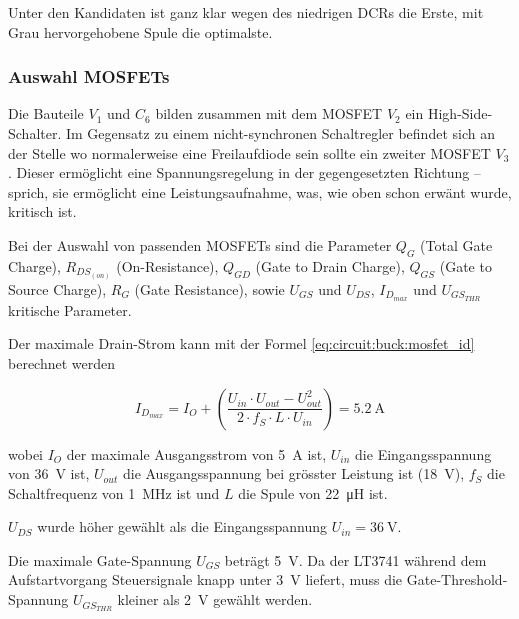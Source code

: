 Unter den Kandidaten ist ganz klar wegen des niedrigen DCRs die Erste,  mit Grau
hervorgehobene Spule die optimalste.

\subsubsection*{Auswahl MOSFETs}

Die  Bauteile  $V_1$  und  $C_6$  bilden  zusammen  mit  dem  MOSFET  $V_2$  ein
High-Side-Schalter. Im Gegensatz zu einem nicht-synchronen Schaltregler befindet
sich  an  der Stelle wo normalerweise eine Freilaufdiode sein sollte ein zweiter
MOSFET $V_3$. Dieser erm\"oglicht  eine  Spannungsregelung in der gegengesetzten
Richtung -- sprich, sie erm\"oglicht eine Leistungsaufnahme, was, wie oben schon
erw\"ant wurde, kritisch ist.

Bei  der  Auswahl von passenden MOSFETs sind die  Parameter  $Q_G$  (Total  Gate
Charge),  $R_{DS_{(on)}}$  (On-Resistance),  $Q_{GD}$  (Gate to  Drain  Charge),
$Q_{GS}$ (Gate to Source  Charge),  $R_G$  (Gate Resistance), sowie $U_{GS}$ und
$U_{DS}$, $I_{D_{max}}$ und $U_{GS_{THR}}$ kritische Parameter.

Der  maximale  Drain-Strom  kann mit der Formel  \ref{eq:circuit:buck:mosfet_id}
berechnet werden

\begin{equation}
    I_{D_{max}} = I_O + \left( \frac{U_{in} \cdot U_{out} - U_{out}^2}{2 \cdot f_S \cdot L \cdot U_{in}} \right) = \SI{5.2}{\ampere}
    \label{eq:circuit:buck:mosfet_id}
\end{equation}

wobei $I_O$ der maximale Ausgangsstrom  von  \SI{5}{\ampere}  ist,  $U_{in}$ die
Eingangsspannung von  \SI{36}{\volt}  ist,  $U_{out}$  die  Ausgangsspannung bei
gr\"osster  Leistung  ist   (\SI{18}{\volt}),   $f_S$   die  Schaltfrequenz  von
\SI{1}{\mega\hertz}  ist  und  $L$  die  Spule  von  \SI{22}{\micro\henry}  ist.

$U_{DS}$  wurde   h\"oher   gew\"ahlt   als   die   Eingangsspannung  $U_{in}  =
\SI{36}{\volt}$.

Die maximale  Gate-Spannung  $U_{GS}$  betr\"agt  \SI{5}{\volt}.  Da  der LT3741
w\"ahrend  dem Aufstartvorgang Steuersignale knapp unter \SI{3}{\volt}  liefert,
muss  die  Gate-Threshold-Spannung  $U_{GS_{THR}}$  kleiner   als  \SI{2}{\volt}
gew\"ahlt werden.


